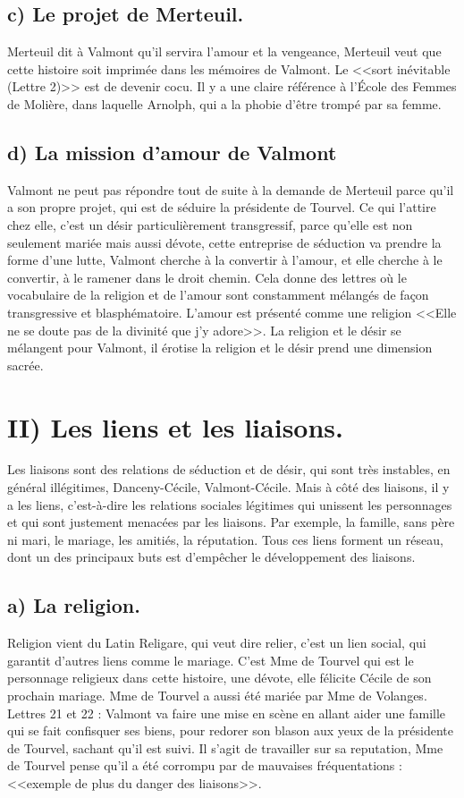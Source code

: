 \documentclass[12pt]{article}
\begin{document}
\subsection*{c) Le projet de Merteuil.}
Merteuil dit à Valmont qu'il servira l'amour et la vengeance, Merteuil veut que cette histoire soit imprimée dans les mémoires de Valmont. Le <<sort inévitable (Lettre 2)>> est de devenir cocu.
Il y a une claire référence à l'École des Femmes de Molière, dans laquelle Arnolph, qui a la phobie d'être trompé par sa femme.
\subsection*{d) La mission d'amour de Valmont}
Valmont ne peut pas répondre tout de suite à la demande de Merteuil parce qu'il a son propre projet, qui est de séduire la présidente de Tourvel.
Ce qui l'attire chez elle, c'est un désir particulièrement transgressif, parce qu'elle est non seulement mariée mais aussi dévote, cette entreprise de séduction va prendre la forme d'une lutte, Valmont cherche à la convertir à l'amour, et elle cherche à le convertir, à le ramener dans le droit chemin.
Cela donne des lettres où le vocabulaire de la religion et de l'amour sont constamment mélangés de façon transgressive et blasphématoire.
L'amour est présenté  comme une religion <<Elle ne se doute pas de la divinité que j'y adore>>.
La religion et le désir se mélangent pour Valmont, il érotise la religion et le désir prend une dimension sacrée.
\section*{II) Les liens et les liaisons.}
Les liaisons sont des relations de séduction et de désir, qui sont très instables, en général illégitimes, Danceny-Cécile, Valmont-Cécile.
Mais à côté des liaisons, il y a les liens, c'est-à-dire les relations sociales légitimes qui unissent les personnages et qui sont justement menacées par les liaisons.
Par exemple, la famille, sans père ni mari, le mariage, les amitiés, la réputation. Tous ces liens forment un réseau, dont un des principaux buts est d'empêcher le développement des liaisons.
\pagebreak
\subsection*{a) La religion.}
Religion vient du Latin Religare, qui veut dire relier, c'est un lien social, qui garantit d'autres liens comme le mariage.
C'est Mme de Tourvel qui est le personnage religieux dans cette histoire, une dévote, elle félicite Cécile de son prochain mariage.
Mme de Tourvel a aussi été mariée par Mme de Volanges.
Lettres 21 et 22 : Valmont va faire une mise en scène en allant aider une famille qui se fait confisquer ses biens, pour redorer son blason aux yeux de la présidente de Tourvel, sachant qu'il est suivi.
Il s'agit de travailler sur sa reputation, Mme de Tourvel pense qu'il a été corrompu par de mauvaises fréquentations : <<exemple de plus du danger des liaisons>>.
\end{document}
